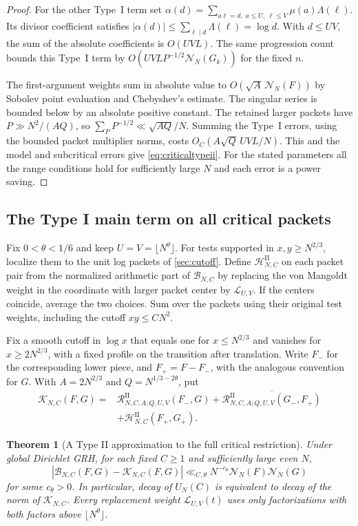 \documentclass[11pt,a4paper]{article}
\numberwithin{equation}{section}
\newtheorem{theorem}{Theorem}[section]
\newcommand{\NN}{\mathcal N_N}
\begin{document}
\begin{proof}
For the other Type~I term set
$\alpha(d)=\sum_{a\ell=d,\;a\le U,\;\ell\le V}\mu(a)\Lambda(\ell)$.
Its divisor coefficient satisfies
$|\alpha(d)|\le\sum_{\ell\mid d}\Lambda(\ell)=\log d$.
With $d\le UV$, the sum of the absolute coefficients
is $O(UV L)$. The same progression count bounds
this Type~I term by $O(UV L P^{-1/2}\NN(G_k))$
for the fixed $n$.

The first-argument weights sum in absolute value to
$O(\sqrt A\,\NN(F))$ by Sobolev point evaluation and
Chebyshev's estimate. The singular series is bounded
below by an absolute positive constant. The retained
larger packets have $P\gg N^2/(AQ)$, so
$\sum_P P^{-1/2}\ll \sqrt{AQ}/N$.
Summing the Type~I errors, using the bounded packet
multiplier norms, costs $O_C(A\sqrt Q\, UV L/N)$.
This and the model and subcritical errors give
\cref{eq:criticaltypeii}. For the stated parameters
all the range conditions hold for sufficiently large
$N$ and each error is a power saving.
\end{proof}

\subsection{The Type I main term on all critical packets}

Fix $0<\theta<1/6$ and keep $U=V=\lfloor N^\theta\rfloor$.
For tests supported in $x,y\ge N^{2/3}$, localize them to the unit log packets
of \cref{sec:cutoff}. Define $\mathcal H^{\mathrm{II}}_{N,C}$
on each packet pair from the normalized arithmetic
part of $\mathcal B_{N,C}$ by replacing the von Mangoldt
weight in the coordinate with larger packet center by
$\mathcal L_{U,V}$. If the centers coincide, average the two
choices. Sum over the packets using their original test
weights, including the cutoff $xy\le CN^2$.

Fix a smooth cutoff in $\log x$ that equals one for
$x\le N^{2/3}$ and vanishes for $x\ge 2N^{2/3}$,
with a fixed profile on the transition after translation.
Write $F_-$ for the corresponding lower piece, and
$F_+=F-F_-$, with the analogous convention for $G$.
With $A=2N^{2/3}$ and $Q=N^{1/3-2\theta}$, put
\begin{align*}
 \mathcal K_{N,C}(F,G)={}&
  \mathcal R^{\mathrm{II}}_{N,C,A;Q,U,V}(F_-,G)
 +\overline{\mathcal R^{\mathrm{II}}_{N,C,A;Q,U,V}(G_-,F_+)}\\
 &+\mathcal H^{\mathrm{II}}_{N,C}(F_+,G_+).
\end{align*}

\begin{theorem}[A Type II approximation to the full critical restriction]
\label{thm:fullcriticaltypeii}
Under global Dirichlet GRH, for each fixed $C\ge1$ and
sufficiently large even $N$,
\begin{equation}
 |\mathcal B_{N,C}(F,G)-\mathcal K_{N,C}(F,G)|
     \ll_{C,\theta} N^{-c_\theta}\NN(F)\NN(G)
 \label{eq:fullcriticaltypeii}
\end{equation}
for some $c_\theta>0$. In particular, decay of $U_N(C)$
is equivalent to decay of the norm of $\mathcal K_{N,C}$.
Every replacement weight $\mathcal L_{U,V}(t)$ uses only
factorizations with both factors above $\lfloor N^\theta\rfloor$.
\end{theorem}
\end{document}

